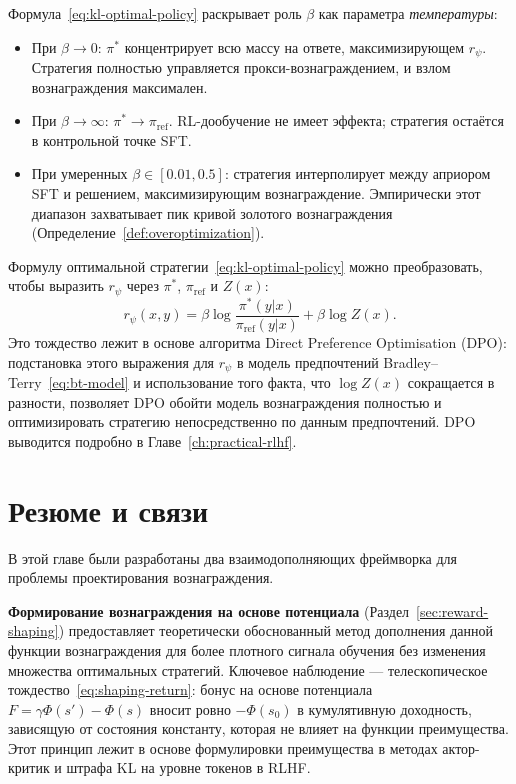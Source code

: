 Формула~\eqref{eq:kl-optimal-policy} раскрывает роль $\beta$ как параметра \emph{температуры}:
\begin{itemize}[leftmargin=*]
  \item При $\beta \to 0$: $\pi^*$ концентрирует всю массу на ответе, максимизирующем $r_\psi$. Стратегия полностью управляется прокси-вознаграждением, и взлом вознаграждения максимален.
  \item При $\beta \to \infty$: $\pi^* \to \pi_{\mathrm{ref}}$. RL-дообучение не имеет эффекта; стратегия остаётся в контрольной точке SFT.
  \item При умеренных $\beta \in [0.01, 0.5]$: стратегия интерполирует между априором SFT и решением, максимизирующим вознаграждение. Эмпирически этот диапазон захватывает пик кривой золотого вознаграждения (Определение~\ref{def:overoptimization}).
\end{itemize}

\begin{remark}
\label{rem:dpo-connection}
Формулу оптимальной стратегии~\eqref{eq:kl-optimal-policy} можно преобразовать, чтобы выразить $r_\psi$ через $\pi^*$, $\pi_{\mathrm{ref}}$ и $Z(x)$:
\[
r_\psi(x, y) = \beta\log\frac{\pi^*(y|x)}{\pi_{\mathrm{ref}}(y|x)} + \beta\log Z(x).
\]
Это тождество лежит в основе алгоритма Direct Preference Optimisation (DPO): подстановка этого выражения для $r_\psi$ в модель предпочтений Bradley--Terry~\eqref{eq:bt-model} и использование того факта, что $\log Z(x)$ сокращается в разности, позволяет DPO обойти модель вознаграждения полностью и оптимизировать стратегию непосредственно по данным предпочтений. DPO выводится подробно в Главе~\ref{ch:practical-rlhf}.
\end{remark}

\section{Резюме и связи}
\label{sec:ch10-summary}

В этой главе были разработаны два взаимодополняющих фреймворка для проблемы проектирования вознаграждения.

\textbf{Формирование вознаграждения на основе потенциала} (Раздел~\ref{sec:reward-shaping}) предоставляет теоретически обоснованный метод дополнения данной функции вознаграждения для более плотного сигнала обучения без изменения множества оптимальных стратегий. Ключевое наблюдение --- телескопическое тождество~\eqref{eq:shaping-return}: бонус на основе потенциала $F = \gamma\Phi(s') - \Phi(s)$ вносит ровно $-\Phi(s_0)$ в кумулятивную доходность, зависящую от состояния константу, которая не влияет на функции преимущества. Этот принцип лежит в основе формулировки преимущества в методах актор-критик и штрафа KL на уровне токенов в RLHF.

